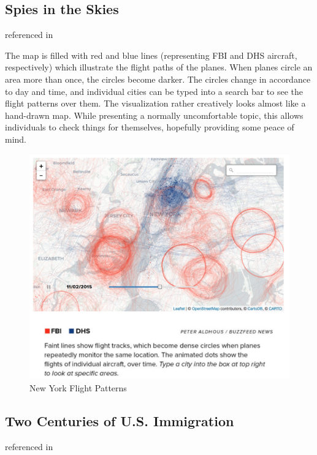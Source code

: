 \documentclass[]{book}
\theoremstyle{definition}
\theoremstyle{definition}
\theoremstyle{definition}
\theoremstyle{remark}
\begin{document}
\subsection{Spies in the Skies}\label{spies-in-the-skies}

\citep{spies_sky} referenced in \citep{cool_data}

The map is filled with red and blue lines (representing FBI and DHS
aircraft, respectively) which illustrate the flight paths of the planes.
When planes circle an area more than once, the circles become darker.
The circles change in accordance to day and time, and individual cities
can be typed into a search bar to see the flight patterns over them. The
visualization rather creatively looks almost like a hand-drawn map.
While presenting a normally uncomfortable topic, this allows individuals
to check things for themselves, hopefully providing some peace of mind.

\begin{figure}
\centering
\includegraphics{images/NYCflights.png}
\caption{New York Flight Patterns}
\end{figure}

\subsection{Two Centuries of U.S.
Immigration}\label{two-centuries-of-u.s.-immigration}

\citep{Immigration} referenced in \citep{cool_data}
\end{document}
